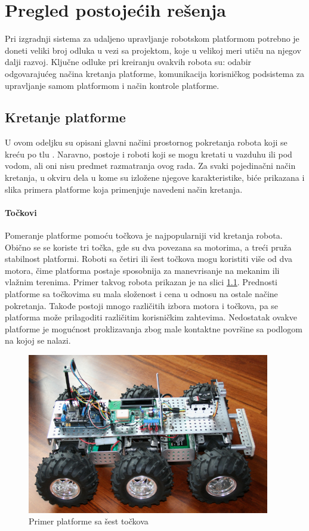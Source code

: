 \documentclass[12pt,a4paper]{report}
\begin{document}
\newpage


\chapter{Pregled postojećih rešenja}
Pri izgradnji sistema za udaljeno upravljanje robotskom platformom potrebno je doneti veliki broj odluka u vezi sa projektom, koje u velikoj meri utiču na njegov dalji razvoj. Ključne odluke pri kreiranju ovakvih robota su: odabir odgovarajućeg načina kretanja platforme, komunikacija korisničkog podsistema za upravljanje samom platformom i način kontrole platforme.

\section{Kretanje platforme}
U ovom odeljku su opisani glavni načini prostornog pokretanja robota koji se kreću po tlu \cite{platform-types}. Naravno, postoje i roboti koji se mogu kretati u vazduhu ili pod vodom, ali oni nisu predmet razmatranja ovog rada. Za svaki pojedinačni način kretanja, u okviru dela u kome su izložene njegove karakteristike, biće prikazana i slika primera platforme koja primenjuje navedeni način kretanja.

\subsubsection{Točkovi}

Pomeranje platforme pomoću točkova je najpopularniji vid kretanja robota. Obično se se koriste tri točka, gde su dva povezana sa motorima, a treći pruža stabilnost platformi. Roboti sa četiri ili šest točkova mogu koristiti više od dva motora, čime platforma postaje sposobnija za manevrisanje na mekanim ili vlažnim terenima. Primer takvog robota prikazan je na slici \ref{fig:wheels}. Prednosti platforme sa točkovima su mala složenost i cena u odnosu na ostale načine pokretanja. Takođe postoji mnogo različitih izbora motora i točkova, pa se platforma može prilagoditi različitim korisničkim zahtevima. Nedostatak ovakve platforme je mogućnost proklizavanja zbog male kontaktne površine sa podlogom na kojoj se nalazi.

\begin{figure}[H]
    \centering    
    \includegraphics[height=7cm, keepaspectratio]{img/wheels.png}    
    \caption{Primer platforme sa šest točkova}
    \label{fig:wheels}
\end{figure}
\end{document}
